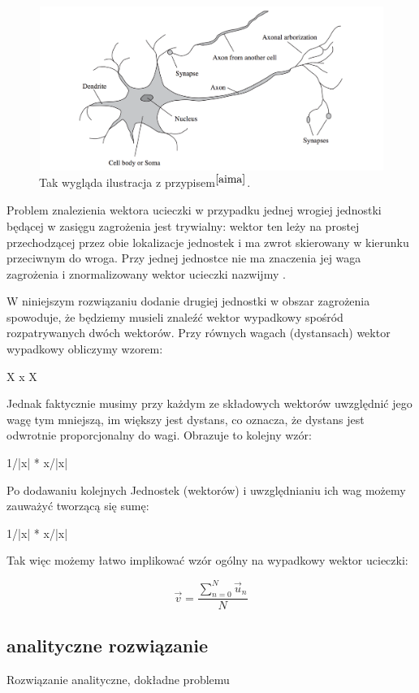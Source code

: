\documentclass[12pt]{report}
\begin{document}
\begin{figure}[h!]
\includegraphics[width=\textwidth]{neuron}
\caption{Tak wygląda ilustracja z przypisem$^{\cite{aima}}$.}
\end{figure}

Problem znalezienia wektora ucieczki w przypadku jednej wrogiej jednostki będącej w zasięgu zagrożenia jest trywialny:
wektor ten leży na prostej przechodzącej przez obie lokalizacje jednostek i ma zwrot skierowany w kierunku przeciwnym do wroga. Przy jednej jednostce nie ma znaczenia jej waga zagrożenia i znormalizowany wektor ucieczki nazwijmy .


W niniejszym rozwiązaniu dodanie drugiej jednostki w obszar zagrożenia spowoduje, że będziemy musieli znaleźć wektor wypadkowy spośród rozpatrywanych dwóch wektorów. Przy równych wagach (dystansach) wektor wypadkowy obliczymy wzorem:

X x X

Jednak faktycznie musimy przy każdym ze składowych wektorów uwzględnić jego wagę tym mniejszą, im większy jest dystans, co oznacza, że dystans jest odwrotnie proporcjonalny do wagi. Obrazuje to kolejny wzór:

1/|x| * x/|x|

Po dodawaniu kolejnych Jednostek (wektorów) i uwzględnianiu ich wag możemy zauważyć tworzącą się sumę:




1/|x| * x/|x|

Tak więc możemy łatwo implikować wzór ogólny na wypadkowy wektor ucieczki:

$$\vec v = \dfrac{\sum_{n=0}^{N}  \vec u_n}{N}   $$

\subsection{analityczne rozwiązanie}
Rozwiązanie analityczne, dokładne problemu
\end{document}
